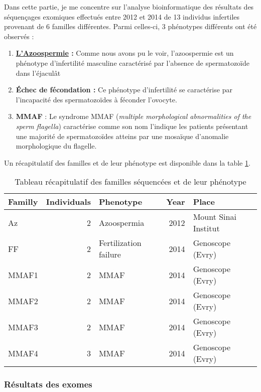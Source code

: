 \documentclass[12pt,twoside]{reedthesis}
\providecommand{\tightlist}{%
  \setlength{\itemsep}{0pt}\setlength{\parskip}{0pt}}
\theoremstyle{definition}
\theoremstyle{definition}
\theoremstyle{remark}
\begin{document}
  Dans cette partie, je me concentre sur l'analyse bioinformatique des
  résultats des séquençages exomiques effectués entre 2012 et 2014 de 13
  individus infertiles provenant de 6 familles différentes. Parmi
  celles-ci, 3 phénotypes différents ont été observés :
  
  \begin{enumerate}
  \def\labelenumi{\arabic{enumi}.}
  \tightlist
  \item
    \textbf{\protect\hyperlink{infquant}{L'Azoospermie} :} Comme nous
    avons pu le voir, l'azoospermie est un phénotype d'infertilité
    masculine caractérisé par l'absence de spermatozoïde dans l'éjaculât\\
  \item
    \textbf{Échec de fécondation :} Ce phénotype d'infertilité se
    caractérise par l'incapacité des spermatozoïdes à féconder
    l'ovocyte.\\
  \item
    \textbf{MMAF} : Le syndrome MMAF (\emph{multiple morphological
    abnormalities of the sperm flagella}) caractérise comme son nom
    l'indique les patients présentant une majorité de spermatozoïdes
    atteins par une mosaïque d'anomalie morphologique du flagelle.
  \end{enumerate}
  
  Un récapitulatif des familles et de leur phénotype est disponible dans
  la table \ref{tab:tabrecapfam}.
  
  \begin{longtable}[t]{lrlrl}
  \caption{\label{tab:tabrecapfam}Tableau récapitulatif des familles séquencées et de leur phénotype}\\
  \toprule
  Familly & Individuals & Phenotype & Year & Place\\
  \midrule
  Az & 2 & Azoospermia & 2012 & Mount Sinai Institut\\
  FF & 2 & Fertilization failure & 2014 & Genoscope (Evry)\\
  MMAF1 & 2 & MMAF & 2014 & Genoscope (Evry)\\
  MMAF2 & 2 & MMAF & 2014 & Genoscope (Evry)\\
  MMAF3 & 2 & MMAF & 2014 & Genoscope (Evry)\\
  MMAF4 & 3 & MMAF & 2014 & Genoscope (Evry)\\
  \bottomrule
  \end{longtable}
  
  \newpage  
  
  \subsubsection{Résultats des exomes}\label{resultats-des-exomes}
  
\end{document}
